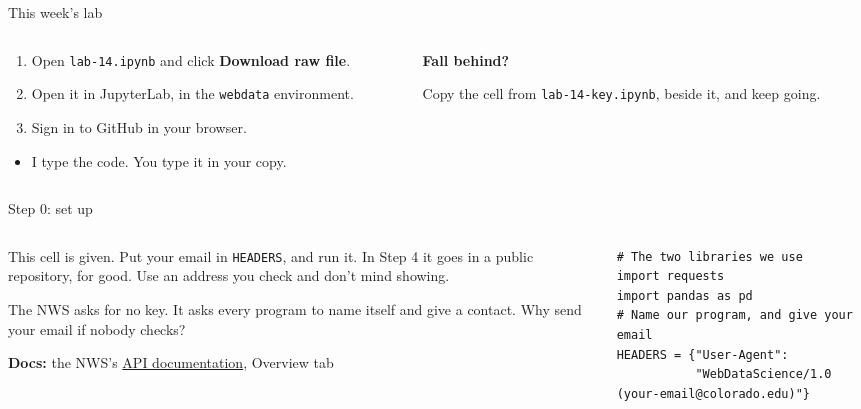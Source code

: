 \documentclass[9pt,aspectratio=169]{beamer}
\begin{document}
\begin{frame}{This week's lab}
    \begin{columns}[T]
        \begin{column}{0.6\textwidth}
            \begin{enumerate}\small
                \item Open \texttt{lab-14.ipynb} and click \textbf{Download raw file}.
                \item Open it in JupyterLab, in the \texttt{webdata} environment.
                \item Sign in to GitHub in your browser.
            \end{enumerate}
            \medskip
            \begin{itemize}\small
                \item I type the code. You type it in your copy.
            \end{itemize}
        \end{column}
        \begin{column}{0.35\textwidth}
            \textbf{Fall behind?}\\[2pt]
            {\footnotesize Copy the cell from \texttt{lab-14-key.ipynb}, beside it, and keep going.\par}
        \end{column}
    \end{columns}
\end{frame}

\begin{frame}[fragile]{Step 0: set up}
    \begin{columns}[T]
        \begin{column}{0.37\textwidth}
            This cell is given. Put your email in \texttt{HEADERS}, and run it. In Step 4 it goes in a public repository, for good. Use an address you check and don't mind showing.

            \medskip
            The NWS asks for no key. It asks every program to name itself and give a contact. Why send your email if nobody checks?

            \medskip
            {\scriptsize\textbf{Docs:} the NWS's \href{https://www.weather.gov/documentation/services-web-api}{API documentation}, Overview tab\par}
        \end{column}
        \begin{column}{0.6\textwidth}
\begin{lstlisting}
# The two libraries we use
import requests
import pandas as pd
# Name our program, and give your email
HEADERS = {"User-Agent":
           "WebDataScience/1.0 (your-email@colorado.edu)"}
\end{lstlisting}
        \end{column}
    \end{columns}
\end{frame}
\end{document}

